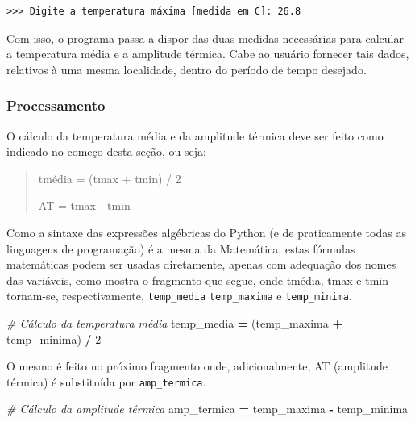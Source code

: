 \documentclass[
]{book}
\newenvironment{Shaded}{\begin{snugshade}}{\end{snugshade}}
\newcommand{\CommentTok}[1]{\textcolor[rgb]{0.56,0.35,0.01}{\textit{#1}}}
\newcommand{\DecValTok}[1]{\textcolor[rgb]{0.00,0.00,0.81}{#1}}
\newcommand{\NormalTok}[1]{#1}
\newcommand{\OperatorTok}[1]{\textcolor[rgb]{0.81,0.36,0.00}{\textbf{#1}}}
\begin{document}
\begin{verbatim}
>>> Digite a temperatura máxima [medida em C]: 26.8
\end{verbatim}

Com isso, o programa passa a dispor das duas medidas necessárias para calcular a temperatura média e a amplitude térmica. Cabe ao usuário fornecer tais dados, relativos à uma mesma localidade, dentro do período de tempo desejado.

\hypertarget{processamento}{%
\subsubsection{Processamento}\label{processamento}}

O cálculo da temperatura média e da amplitude térmica deve ser feito como indicado no começo desta seção, ou seja:

\begin{quote}
tmédia = (tmax + tmin) / 2

AT = tmax - tmin
\end{quote}

Como a sintaxe das expressões algébricas do Python (e de praticamente todas as linguagens de programação) é a mesma da Matemática, estas fórmulas matemáticas podem ser usadas diretamente, apenas com adequação dos nomes das variáveis, como mostra o fragmento que segue, onde tmédia, tmax e tmin tornam-se, respectivamente, \texttt{temp\_media} \texttt{temp\_maxima} e \texttt{temp\_minima}.

\begin{Shaded}
\begin{Highlighting}[]
\CommentTok{\# Cálculo da temperatura média}
\NormalTok{temp\_media }\OperatorTok{=}\NormalTok{ (temp\_maxima }\OperatorTok{+}\NormalTok{ temp\_minima) }\OperatorTok{/} \DecValTok{2}
\end{Highlighting}
\end{Shaded}

O mesmo é feito no próximo fragmento onde, adicionalmente, AT (amplitude térmica) é substituída por \texttt{amp\_termica}.

\begin{Shaded}
\begin{Highlighting}[]
\CommentTok{\# Cálculo da amplitude térmica}
\NormalTok{amp\_termica }\OperatorTok{=}\NormalTok{ temp\_maxima }\OperatorTok{{-}}\NormalTok{ temp\_minima}
\end{Highlighting}
\end{Shaded}
\end{document}
